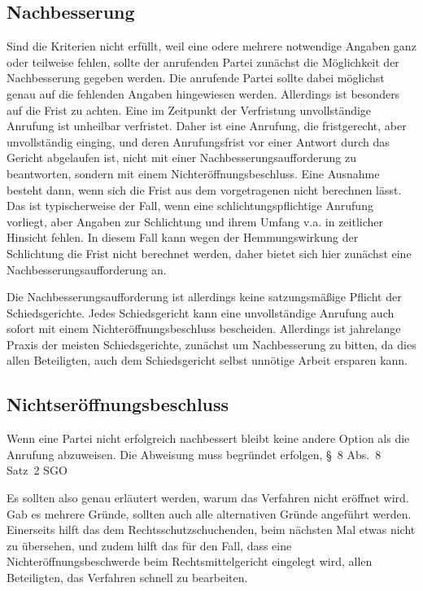 \subsection{Nachbesserung}
\label{Standardworkflow:Beschluss:Nachbesserung}
Sind die Kriterien nicht erfüllt, weil eine odere mehrere notwendige Angaben ganz oder teilweise fehlen, sollte der anrufenden Partei zunächst die Möglichkeit der Nachbesserung gegeben werden.
Die anrufende Partei sollte dabei möglichst genau auf die fehlenden Angaben hingewiesen werden.
Allerdings ist besonders auf die Frist zu achten.
Eine im Zeitpunkt der Verfristung unvollständige Anrufung ist unheilbar verfristet.
Daher ist eine Anrufung, die fristgerecht, aber unvollständig einging, und deren Anrufungsfrist vor einer Antwort durch das Gericht abgelaufen ist, nicht mit einer Nachbesserungsaufforderung zu beantworten, sondern mit einem Nichteröffnungsbeschluss.
Eine Ausnahme besteht dann, wenn sich die Frist aus dem vorgetragenen nicht berechnen lässt.
Das ist typischerweise der Fall, wenn eine schlichtungspflichtige Anrufung vorliegt, aber Angaben zur Schlichtung und ihrem Umfang v.a. in zeitlicher Hinsicht fehlen.
In diesem Fall kann wegen der Hemmungswirkung der Schlichtung die Frist nicht berechnet werden, daher bietet sich hier zunächst eine Nachbesserungsaufforderung an.

Die Nachbesserungsaufforderung ist allerdings keine satzungsmäßige Pflicht der Schiedsgerichte.
Jedes Schiedsgericht kann eine unvollständige Anrufung auch sofort mit einem Nichteröffnungsbeschluss bescheiden.
Allerdings ist jahrelange Praxis der meisten Schiedsgerichte, zunächst um Nachbesserung zu bitten, da dies allen Beteiligten, auch dem Schiedsgericht selbst unnötige Arbeit ersparen kann.

\subsection{Nichtseröffnungsbeschluss}
\label{Standardworkflow:Beschluss:Nichteroeffnung}
Wenn eine Partei nicht erfolgreich nachbessert bleibt keine andere Option als die Anrufung abzuweisen.
Die Abweisung muss begründet erfolgen, \S~8 Abs.~8 Satz~2 SGO

Es sollten also genau erläutert werden, warum das Verfahren nicht eröffnet wird.
Gab es mehrere Gründe, sollten auch alle alternativen Gründe angeführt werden.
Einerseits hilft das dem Rechtsschutzschuchenden, beim nächsten Mal etwas nicht zu übersehen, und zudem hilft das für den Fall, dass eine Nichteröffnungsbeschwerde beim Rechtsmittelgericht eingelegt wird, allen Beteiligten, das Verfahren schnell zu bearbeiten.

